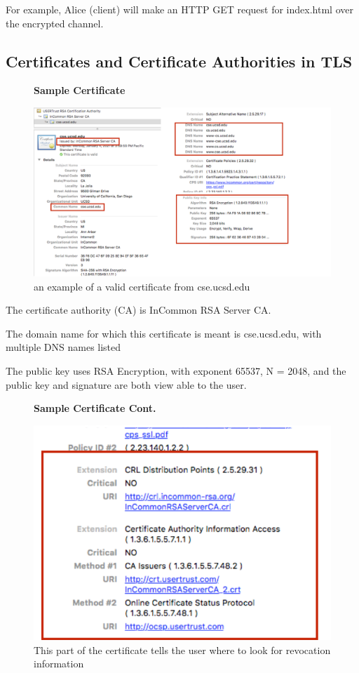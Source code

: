 \documentclass[11pt]{article} %
\begin{document}
{\noindent For example, Alice (client) will make an HTTP GET request for index.html over 
the encrypted channel.

\subsection{Certificates and Certificate Authorities in TLS}
\begin{figure}[H]
    \centering
    \textbf{Sample Certificate}\par\medskip
    \includegraphics[scale=.4]{./cert1.png}
    \caption{an example of a valid certificate from cse.ucsd.edu}
\end{figure}

\smallskip
\noindent The certificate authority (CA) is InCommon RSA Server CA.

\smallskip
\noindent The domain name for which this certificate is meant is 
cse.ucsd.edu, with multiple DNS names listed

\smallskip
\noindent The public key uses RSA Encryption, with exponent 65537, N = 2048,
and the public key and signature are both view able to the user.

\begin{figure}[H]
    \centering
    \textbf{Sample Certificate Cont.}\par\medskip
    \includegraphics[scale=.5]{./cert2.png}
    \caption{This part of the certificate tells the user where to look for revocation information}
\end{figure}


}
\end{document}
